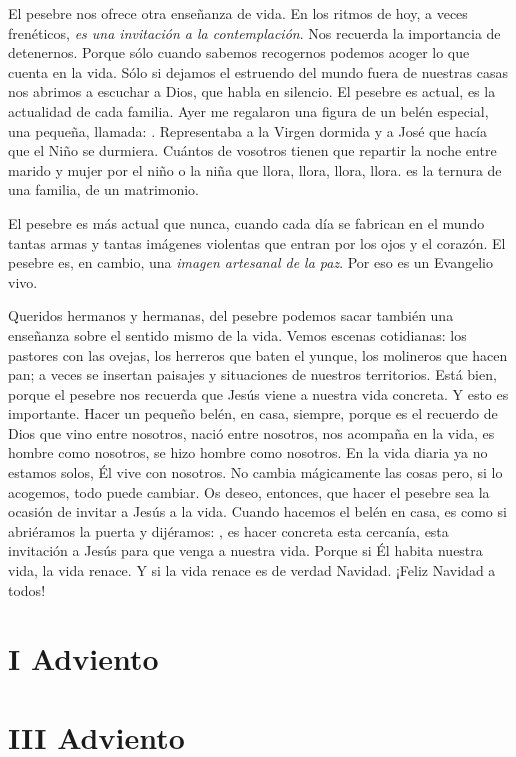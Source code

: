 El pesebre nos ofrece otra enseñanza de vida. En los ritmos de hoy, a veces frenéticos, \emph{es una invitación a la contemplación}. Nos recuerda la importancia de detenernos. Porque sólo cuando sabemos recogernos podemos acoger lo que cuenta en la vida. Sólo si dejamos el estruendo del mundo fuera de nuestras casas nos abrimos a escuchar a Dios, que habla en silencio. El pesebre es actual, es la actualidad de cada familia. Ayer me regalaron una figura de un belén especial, una pequeña, llamada: . Representaba a la Virgen dormida y a José que hacía que el Niño se durmiera. Cuántos de vosotros tienen que repartir la noche entre marido y mujer por el niño o la niña que llora, llora, llora, llora.  es la ternura de una familia, de un matrimonio.

El pesebre es más actual que nunca, cuando cada día se fabrican en el mundo tantas armas y tantas imágenes violentas que entran por los ojos y el corazón. El pesebre es, en cambio, una \emph{imagen artesanal de la paz}. Por eso es un Evangelio vivo.

Queridos hermanos y hermanas, del pesebre podemos sacar también una enseñanza sobre el sentido mismo de la vida. Vemos escenas cotidianas: los pastores con las ovejas, los herreros que baten el yunque, los molineros que hacen pan; a veces se insertan paisajes y situaciones de nuestros territorios. Está bien, porque el pesebre nos recuerda que Jesús viene a nuestra vida concreta. Y esto es importante. Hacer un pequeño belén, en casa, siempre, porque es el recuerdo de Dios que vino entre nosotros, nació entre nosotros, nos acompaña en la vida, es hombre como nosotros, se hizo hombre como nosotros. En la vida diaria ya no estamos solos, Él vive con nosotros. No cambia mágicamente las cosas pero, si lo acogemos, todo puede cambiar. Os deseo, entonces, que hacer el pesebre sea la ocasión de invitar a Jesús a la vida. Cuando hacemos el belén en casa, es como si abriéramos la puerta y dijéramos: , es hacer concreta esta cercanía, esta invitación a Jesús para que venga a nuestra vida. Porque si Él habita nuestra vida, la vida renace. Y si la vida renace es de verdad Navidad. ¡Feliz Navidad a todos!

\section{I Adviento}


\section{III Adviento} 

